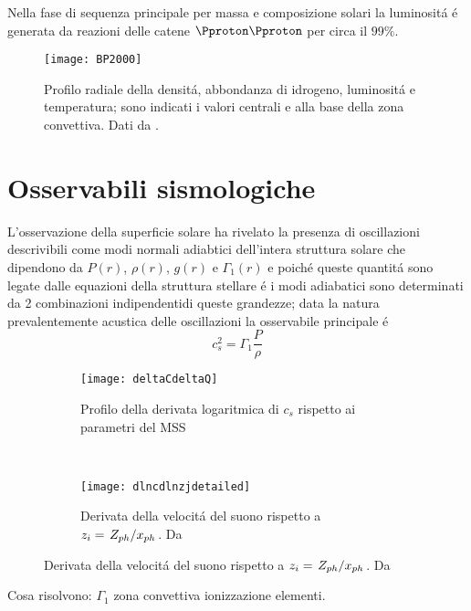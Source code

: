 \documentclass[../main.tex]{subfiles}
\begin{document}
\begin{workout}
Nella fase di sequenza principale per massa e composizione solari la luminosit\'a \'e generata da reazioni delle catene $\Pproton\Pproton$ per circa il $99\%$.
\end{workout}

\begin{figure}[!h]
\texttt{[image: BP2000]}
\caption{Profilo radiale della densit\'a, abbondanza di idrogeno, luminosit\'a e temperatura; sono indicati i valori centrali e alla base della zona convettiva. Dati da \cite{BP2000}.}
\end{figure}

\section{Osservabili sismologiche}


L'osservazione della superficie solare ha rivelato la presenza di oscillazioni descrivibili come modi normali adiabtici dell'intera struttura solare che dipendono da $P(r)$, $\rho(r)$, $g(r)$ e $\Gamma_1(r)$ e poich\'e queste quantit\'a sono legate dalle equazioni della struttura stellare \'e i modi adiabatici sono determinati da 2 combinazioni indipendentidi queste grandezze; data la natura prevalentemente acustica delle oscillazioni la osservabile principale \'e
\begin{equation}
c_s^2=\Gamma_1\frac{P}{\rho}
\end{equation}

\begin{figure}[!h]
\begin{subfigure}[r]{0.6\textwidth}
        \texttt{[image: deltaCdeltaQ]}
        \caption{Profilo della derivata logaritmica di $c_s$ rispetto ai parametri del MSS}
    \end{subfigure}
~
\begin{subfigure}[r]{0.6\textwidth}
        \texttt{[image: dlncdlnzjdetailed]}
        \caption{Derivata della velocit\'a del suono rispetto a $z_i=\left.{Z_{ph}}\middle/{x_{ph}}\right.$. Da \cite{villante2014chemical}}
    \end{subfigure}
\end{figure}



\begin{workout}

Cosa risolvono: $\Gamma_1$ zona convettiva ionizzazione elementi.

\end{workout}
\end{document}
